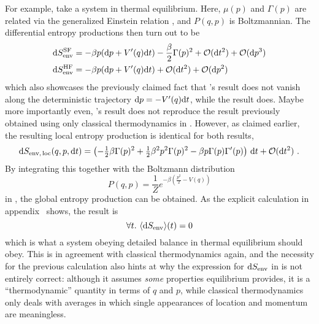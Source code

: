 For example, take a system in thermal equilibrium. Here, \(\mu(p)\) and \(\Gamma(p)\) are related via the generalized Einstein relation , and \(P(q,p)\) is Boltzmannian. The differential entropy productions then turn out to be
%
\begin{align}
	\mathrm{d}S_\text{env}^{\text{SF}} &= -\beta p(\mathrm{d} p + V'(q)\mathrm{d} t) - \frac\beta2\Gamma(p)^2 + \mathcal{O}(\mathrm{d} t^2) + \mathcal{O}(\mathrm{d} p^3) \\
	\mathrm{d}S_\text{env}^{\text{HF}} &= -\beta p(\mathrm{d} p + V'(q)\mathrm{d} t) + \mathcal{O}(\mathrm{d} t^2) + \mathcal{O}(\mathrm{d} p^2)
\end{align}
%
which also showcases the previously claimed fact that \SF's result does not vanish along the deterministic trajectory \(\mathrm{d} p = -V'(q)\mathrm{d} t\), while the \HF{} result does. Maybe more importantly even, \SF's result does not reproduce the result previously obtained using only classical thermodynamics in . However, as claimed earlier, the resulting local entropy production is identical for both results,
%
\begin{equation}
	\mathrm{d}S_\text{env,\,loc}(q,p,\mathrm{d} t) = \left(
		- \tfrac12\beta\Gamma(p)^2
		+ \tfrac12\beta^2p^2\Gamma(p)^2
		- \beta p\Gamma(p)\Gamma'(p)
		\right)\,\mathrm{d} t
		+ \mathcal{O}(\mathrm{d} t^2) ~.
\end{equation}
%
By integrating this together with the Boltzmann distribution
%
\begin{equation}
	P(q,p) = \frac1Z e^{-\beta\left(\frac{p^2}2-V(q)\right)}
\end{equation}
%
in , the global entropy production can be obtained. As the explicit calculation in appendix~ shows, the result is
%
\begin{equation}
	\label{eqn:global entropy 0}
	\forall t. ~ \langle\mathrm{d}S_\text{env}\rangle(t) = 0
\end{equation}
%
which is what a system obeying detailed balance in thermal equilibrium should obey. This is in agreement with classical thermodynamics again, and the necessity for the previous calculation also hints at why the expression for \(\mathrm{d}S_\text{env}\) in  is not entirely correct: although it assumes \emph{some} properties equilibrium provides, it is a ``thermodynamic'' quantity in terms of \(q\) and \(p\), while classical thermodynamics only deals with averages in which single appearances of location and momentum are meaningless.




